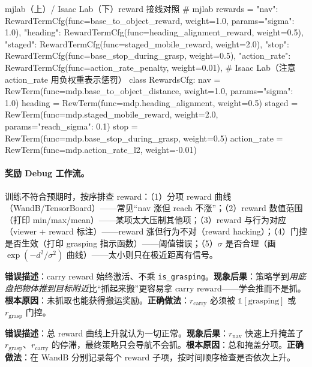 \begin{codebox}[Python]{mjlab（上）/ Isaac Lab（下）reward 接线对照}
# mjlab
rewards = {
    "nav":     RewardTermCfg(func=base_to_object_reward, weight=1.0, params={"sigma": 1.0}),
    "heading": RewardTermCfg(func=heading_alignment_reward, weight=0.5),
    "staged":  RewardTermCfg(func=staged_mobile_reward, weight=2.0),
    "stop":    RewardTermCfg(func=base_stop_during_grasp, weight=0.5),
    "action_rate": RewardTermCfg(func=action_rate_penalty, weight=0.01),
}
# Isaac Lab（注意 action_rate 用负权重表示惩罚）
class RewardsCfg:
    nav         = RewTerm(func=mdp.base_to_object_distance, weight=1.0, params={"sigma": 1.0})
    heading     = RewTerm(func=mdp.heading_alignment, weight=0.5)
    staged      = RewTerm(func=mdp.staged_mobile_reward, weight=2.0, params={"reach_sigma": 0.1})
    stop        = RewTerm(func=mdp.base_stop_during_grasp, weight=0.5)
    action_rate = RewTerm(func=mdp.action_rate_l2, weight=-0.01)
\end{codebox}

\paragraph{奖励 Debug 工作流。}训练不符合预期时，按序排查 reward：（1）分项 reward 曲线（WandB/TensorBoard）——常见“nav 涨但 reach 不涨”；（2）reward 数值范围（打印 min/max/mean）——某项太大压制其他项；（3）reward 与行为对应（viewer + reward 标注）——reward 涨但行为不对（reward hacking）；（4）门控是否生效（打印 grasping 指示函数）——阈值错误；（5）$\sigma$ 是否合理（画 $\exp(-d^2/\sigma^2)$ 曲线）——太小则只在极近距离有信号。

\begin{pitfall}
\textbf{错误描述}：carry reward 始终激活、不乘 \verb|is_grasping|。\textbf{现象后果}：策略学到\emph{用底盘把物体推到目标附近}比“抓起来搬”更容易拿 carry reward——学会推而不是抓。\textbf{根本原因}：未抓取也能获得搬运奖励。\textbf{正确做法}：$r_{\text{carry}}$ 必须被 $\mathbb{1}[\text{grasping}]$ 或 $r_{\text{grasp}}$ 门控。
\end{pitfall}

\begin{pitfall}
\textbf{错误描述}：总 reward 曲线上升就认为一切正常。\textbf{现象后果}：$r_{\text{nav}}$ 快速上升掩盖了 $r_{\text{grasp}}$、$r_{\text{carry}}$ 的停滞，最终策略只会导航不会抓。\textbf{根本原因}：总和掩盖分项。\textbf{正确做法}：在 WandB 分别记录每个 reward 子项，按时间顺序检查是否依次上升。
\end{pitfall}

